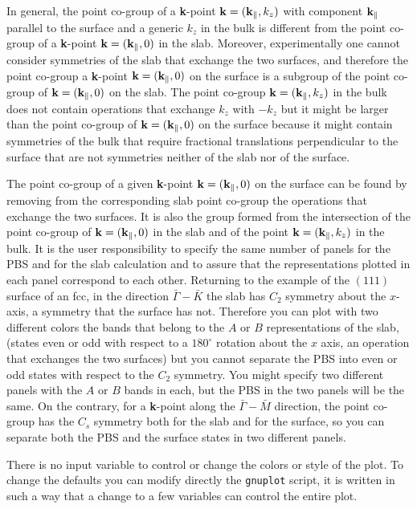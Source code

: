 \documentclass[12pt,a4paper]{article}
\begin{document}
In general, the point co-group of a {\bf k}-point 
${\bf k}=({\bf k}_\parallel, 
k_z)$ with component ${\bf k}_\parallel$ parallel to the surface 
and a generic $k_z$ in the bulk is different 
from the point co-group of a {\bf k}-point ${\bf k}=({\bf k}_\parallel, 0)$ 
in the slab. Moreover, experimentally one cannot consider symmetries
of the slab that exchange the two surfaces, and therefore the 
point co-group a {\bf k}-point ${\bf k}=({\bf k}_\parallel, 0)$ on the surface
is a subgroup of the point co-group of ${\bf k}=({\bf k}_\parallel, 0)$
on the slab. The point co-group ${\bf k}=({\bf k}_\parallel, k_z)$ 
in the bulk does not contain operations that exchange $k_z$ 
with $-k_z$
but it might be larger than the point co-group of 
${\bf k}=({\bf k}_\parallel, 0)$ on the surface because
it might contain symmetries of the bulk that require fractional translations
perpendicular to the surface that are not symmetries neither of the slab nor of
the surface.

The point co-group of a given {\bf k}-point ${\bf k}=({\bf k}_\parallel, 0)$
on the surface can be found by removing from the corresponding slab 
point co-group the
operations that exchange the two surfaces. It is also the group formed
from the intersection of the point co-group of 
${\bf k}=({\bf k}_\parallel, 0)$ in the slab and of the point 
${\bf k}=({\bf k}_\parallel, k_z)$ in the bulk.
It is the user responsibility to specify the same number of panels
for the PBS and for the slab calculation and to assure that the
representations plotted in each panel correspond to each other.
Returning to the example of the $(111)$ surface of an fcc, in the direction
$\bar \Gamma-\bar K$ the slab has $C_2$ symmetry about the $x$-axis, a symmetry
that the surface has not. Therefore you can plot with two different colors
the bands that belong to the $A$ or $B$ representations of the slab,
(states even or odd with respect to a $180^\circ$ rotation about
the $x$ axis, an operation that exchanges the two surfaces)
but you cannot separate the PBS into even or odd states with respect to 
the $C_2$ symmetry. You might specify two different panels with the
$A$ or $B$ bands in each, but the PBS in the two panels will be the same. 
On the contrary, for a {\bf k}-point along the $\bar \Gamma-\bar M$ direction, 
the point co-group has the $C_s$ symmetry both for the slab and for
the surface, so you can separate both the PBS 
and the surface states in two different panels.

There is no input variable to control or change the colors or style of the 
plot. To change the defaults you can modify directly the \texttt{gnuplot} 
script, it is written in such a way that a change to a few variables can
control the entire plot.
\end{document}
